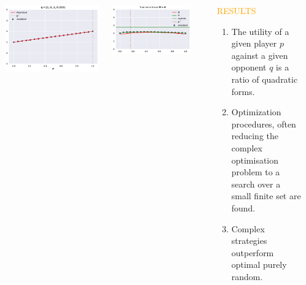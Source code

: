 \documentclass[usenames,dvipsnames,t]{beamer}
\begin{document}
\begin{columns}
\begin{column}{.8\linewidth}
\begin{columns}
\begin{column}{.2\linewidth}
    \end{column}
    \begin{column}{.2\linewidth}
        \includegraphics[width=.9\textwidth]{static/plot_four}
    \end{column}
    \begin{column}{.2\linewidth}
        \includegraphics[width=.9\textwidth, height=0.63\textwidth]{static/tournament}
    \end{column}
\end{columns}
\end{column}
\hrule 
    \begin{column}{.2\linewidth}
        \begin{center}
            \textcolor{orange}{\Large{RESULTS}}
        \end{center}
        \begin{center}
            \begin{enumerate}
                \item The utility of a given player \(p\) against a given opponent \(q\) 
                is a ratio of quadratic forms.
                \item Optimization procedures, often reducing the complex optimisation 
                problem to a search over a small finite set are found.
                \item Complex strategies outperform optimal purely random.
            \end{enumerate}
            \vspace{5cm}
    

\end{center}
\end{column}
\end{columns}
\end{document}

